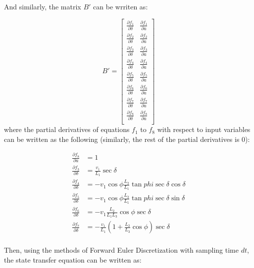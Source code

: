 And similarly, the matrix $B'$ can be wrriten as:

\begin{equation}
    B' = 
    \begin{bmatrix}
    \frac{\partial f_1}{\partial \delta} & \frac{\partial f_1}{\partial a} \\
    \frac{\partial f_2}{\partial \delta} & \frac{\partial f_2}{\partial a} \\
    \frac{\partial f_3}{\partial \delta} & \frac{\partial f_3}{\partial a} \\
    \frac{\partial f_4}{\partial \delta} & \frac{\partial f_4}{\partial a} \\
    \frac{\partial f_5}{\partial \delta} & \frac{\partial f_5}{\partial a} \\
    \frac{\partial f_6}{\partial \delta} & \frac{\partial f_6}{\partial a} \\
    \frac{\partial f_7}{\partial \delta} & \frac{\partial f_7}{\partial a} \\
    \frac{\partial f_8}{\partial \delta} & \frac{\partial f_8}{\partial a} \\
    \end{bmatrix}
\end{equation}
where the partial derivatives of equations $f_1$ to $f_8$ with respect to input variables can be written as the following (similarly, the rest of the partial derivatives is 0):

\begin{equation}
    \begin{aligned} 
        \frac{\partial f_8}{\partial a} &= 1\\
        \frac{\partial f_3}{\partial \delta} &= \frac{v_1}{L_1} \sec{\delta} \\
        \frac{\partial f_4}{\partial \delta} &= - v_1 \cos{\phi} \frac{L_2}{L_1} \tan{phi} \sec{\delta} \cos{\delta} \\
        \frac{\partial f_5}{\partial \delta} &= - v_1 \cos{\phi} \frac{L_2}{L_1} \tan{phi} \sec{\delta} \sin{\delta} \\
        \frac{\partial f_6}{\partial \delta} &= - v_1 \frac{L_2}{L_1 L_3} \cos{\phi} \sec{\delta} \\
        \frac{\partial f_7}{\partial \delta} &= - \frac{v_1}{L_1} (1 + \frac{L_2}{L_3} \cos{\phi}) \sec{\delta} \\
    \end{aligned} 
\end{equation}

Then, using the methods of Forward Euler Discretization with sampling time $dt$, the state transfer equation can be written as:

